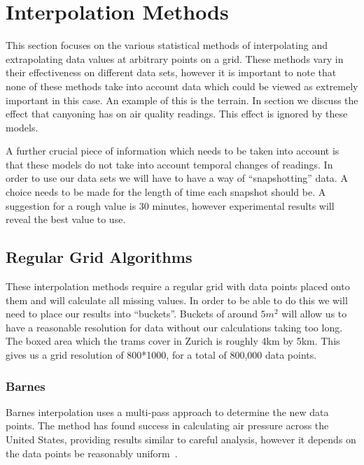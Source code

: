 \section{Interpolation Methods}\label{background_interpolation_methods}
    This section focuses on the various statistical methods of interpolating and extrapolating data values at arbitrary points on a grid. These methods vary in their effectiveness on different data sets, however it is important to note that none of these methods take into account data which could be viewed as extremely important in this case. An example of this is the terrain. In section  we discuss the effect that canyoning has on air quality readings. This effect is ignored by these models. 

    A further crucial piece of information which needs to be taken into account is that these models do not take into account temporal changes of readings. In order to use our data sets we will have to have a way of ``snapshotting'' data. A choice needs to be made for the length of time each snapshot should be. A suggestion for a rough value is 30 minutes, however experimental results will reveal the best value to use.



    \subsection{Regular Grid Algorithms}\label{background_interpolation_methods_regulargrid}

        These interpolation methods require a regular grid with data points placed onto them and will calculate all missing values. In order to be able to do this we will need to place our results into ``buckets''. Buckets of around $5m^{2}$ will allow us to have a reasonable resolution for data without our calculations taking too long. The boxed area which the trams cover in Zurich is roughly 4km by 5km. This gives us a grid resolution of 800*1000, for a total of 800,000 data points. 

        \subsubsection{Barnes}\label{background_interpolation_methods_barnes}

            Barnes interpolation uses a multi-pass approach to determine the new data points. The method has found success in calculating air pressure across the United States, providing results similar to careful analysis, however it depends on the data points be reasonably uniform~\cite{barnesinterpolation}.

